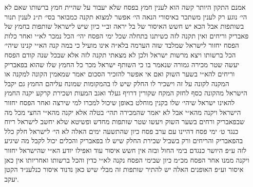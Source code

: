 \documentclass[12pt, openany]{book}
\begin{document}
\begin{multicols}{2}
אמנם התקון היותר קשה הוא לענין חמץ בפסח שלא יעבור על שהיית חמץ ברשותו שאם לא הי׳ נוגע רק לענין משתכר באיסורי הנאה הי׳ אפשר למצוא תקנה כמבואר בסי׳ ת״נ לענין תנור בשותפות אבל הכא יש חשש האיסור של בל יראה וב״י כיון שיש לישראל שותפות בחמץ של פאבריק וריחים ואין תקנה לזה כשיתנו בתחלה שכל ימי הפסח יהי׳ הכל נמכר לא״י ואחר כלות הפסח יחזור לישראל שמלבד שזה הערמה בלא״ה אינו מועיל כי במה קנה הא״י קנינו שיהי׳ הכל ברשותו ויצא מרשות ישראל ולכן לא מצאתי תקנה לזה אלא שבכל שנה קודם הפסח יעשה שטר מכירה גמורה שנאמר בו כי השותף ישראל מכר כל החמץ שלו שהוא בפאבריק וריחים להא״י בשער השוק ואם אי אפשר להזכיר הסכום יאמר שמאמין הקונה למקנה או המקנה לקונה על זה וישכיר לו החלק שיש לו בהמקומות שמונח עליהם החמץ גם יקבל הישראל מהקונה כסף לחזק המקח שקורין דרויף געלד ואגב המעות ושכירת קרקע יקנה החמץ להאינו ישראל שיהי׳ שלו בקנין מוחלט באופן שיכול למכרו למי שירצה ואחר הפסח יחזור הישראל ויקנה מהא״י אבל לא יאמר שהמכירה תהי׳ בטלה אלא יקנה מהא״י החצי מכל מה שבפאבריק ורחים בשער השוק ויעשו שטר שותפות מחדש ופשיטא שלא יחשב לישראל ריוח כנגד ט׳ ימי פסח דהיינו עם ערב פסח כיון שהתשעה ימים האלה לא הי׳ לישראל חלק כלל בהפאבריק והריחים ורק בשביל שכירת החלק שיש לו בפאבריק והכלים יכול לקבל מה שיגיע לזה ע״פ היושר כנגדם בימי החול ובזה אין חשש איסור עוד ואפילו יודע הא״י שהישראל יחזור ויקנה ממנו אחר הפסח מכ״מ כיון שבימי הפסח נקנה לא״י כדין והכל ברשותו ואחריותו אין כאן איסור וע״פ האופנים האלה יש להתיר שותפות זה מבלי שיש כאן נדנוד איסור כנלענ״ד הקטן יעקב.\\\vspace{0pt}

\end{multicols}\newpage
\end{document}
